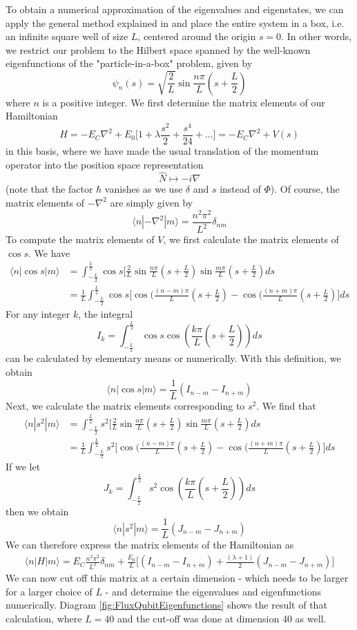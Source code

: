 \documentclass[a4paper, draft]{article}
\theoremstyle{own}
\theoremstyle{remark}
\begin{document}
To obtain a numerical approximation of the eigenvalues and eigenstates, we can apply the general method explained in \cite{JelicMarsiglio} and place the entire system in a box, i.e. an infinite square well of size $L$, centered around the origin $s=0$. In other words, we restrict our problem to the Hilbert space spanned by the well-known eigenfunctions of the "particle-in-a-box" problem, given by
$$
\psi_n(s) = \sqrt{\frac{2}{L}} \sin \frac{n\pi}{L} (s + \frac{L}{2})
$$ 
where $n$ is a positive integer. We first determine the matrix elements of our Hamiltonian
$$
H = - E_C  \nabla^2 + E_0 \big[ 1 + \lambda \frac{s^2}{2} + \frac{s^4}{24} + \dots \big]  = - E_C  \nabla^2 + V(s)
$$
in this basis, where we have made the usual translation of the momentum operator into the position space representation
$$
\hat{N} \mapsto -i \nabla
$$
(note that the factor $\hbar$ vanishes as we use $\delta$ and $s$ instead of $\Phi$). Of course, the matrix elements of $-\nabla^2$ are simply given by
$$
\langle n | - \nabla^2  | m \rangle = \frac{n^2 \pi^2}{L^2} \delta_{nm}
$$
To compute the matrix elements of $V$, we first calculate the matrix elements of $\cos s$. We have
\begin{align*}
\langle n | \cos s | m \rangle &= 
\int_{-\frac{L}{2}}^{\frac{L}{2}}
\cos s \big[ 
\frac{2}{L} \sin \frac{n\pi}{L} (s + \frac{L}{2})
\sin \frac{m\pi}{L} (s + \frac{L}{2})  ds \\
&= \frac{1}{L} \int_{-\frac{L}{2}}^{\frac{L}{2}} \cos s \big[ 
\cos (\frac{(n-m)\pi}{L} (s + \frac{L}{2}) 
-
\cos (\frac{(n+m)\pi}{L} (s + \frac{L}{2}) 
\big] ds
\end{align*}
For any integer $k$, the integral
$$
I_k = \int_{-\frac{L}{2}}^{\frac{L}{2}} \cos s \cos (\frac{k\pi}{L} (s + \frac{L}{2})) ds
$$
can be calculated by elementary means or numerically. With this definition, we obtain
$$
\langle n | \cos s | m \rangle = \frac{1}{L} (I_{n-m} - I_{n+m})
$$
Next, we calculate the matrix elements corresponding to $s^2$. We find that
\begin{align*}
\langle n | s^2 | m \rangle &= 
\int_{-\frac{L}{2}}^{\frac{L}{2}}
s^2 \big[ 
\frac{2}{L} \sin \frac{n\pi}{L} (s + \frac{L}{2})
\sin \frac{m\pi}{L} (s + \frac{L}{2})  ds \\
&= \frac{1}{L} \int_{-\frac{L}{2}}^{\frac{L}{2}} s^2 \big[ 
\cos (\frac{(n-m)\pi}{L} (s + \frac{L}{2}) 
-
\cos (\frac{(n+m)\pi}{L} (s + \frac{L}{2}) 
\big] ds
\end{align*}
If we let
$$
J_k = \int_{-\frac{L}{2}}^{\frac{L}{2}} s^2 \cos (\frac{k\pi}{L} (s + \frac{L}{2})) ds
$$
then we obtain
$$
\langle n | s^2 | m \rangle = \frac{1}{L} (J_{n-m} - J_{n+m})
$$
We can therefore express the matrix elements of the Hamiltonian as
\begin{align*}
\langle n | H | m \rangle = 
E_C \frac{n^2 \pi^2}{L^2} \delta_{nm} + \frac{E_0}{L} \big[ (I_{n-m} - I_{n+m})  + \frac{(\lambda + 1)}{2} (J_{n-m} - J_{n+m}) \big]
\end{align*}
We can now cut off this matrix at a certain dimension - which needs to be larger for a larger choice of $L$ - and determine the eigenvalues and eigenfunctions numerically. Diagram \ref{fig:FluxQubitEigenfunctions} shows the result of that calculation, where $L = 40$ and the cut-off was done at dimension 40 as well. 
\end{document}
